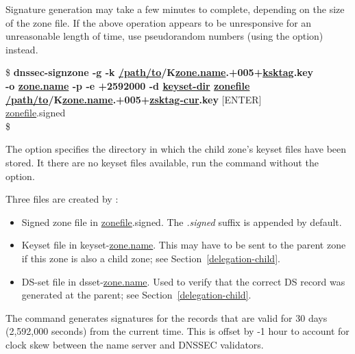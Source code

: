 Signature generation may take a few minutes to complete, depending on the size
of the zone file. If the above operation appears to be unresponsive for an
unreasonable length of time, use pseudorandom numbers (using the 
option) instead.

\begin{tabbing}
\hspace{0.5in}\$ {\bf dnssec-signzone -g -k \underline{/path/to}/K\underline{zone.name}.+005+\underline{ksktag}.key} \\
\hspace{0.5in} {\bf -o \underline{zone.name} -p -e +2592000 -d \underline{keyset-dir} \underline{zonefile}} \\
\hspace{0.5in} {\bf \underline{/path/to}/K\underline{zone.name}.+005+\underline{zsktag-cur}.key} $[$ENTER$]$ \\
\hspace{0.5in} \underline{zonefile}.signed \\
\hspace{0.5in}\$ \\
\end{tabbing}

The  option specifies the directory in which the child zone's
keyset files have been stored.  It there are no keyset files available, run
the  command without the  option.

Three files are created by :
\begin{itemize}
\item Signed zone file in \underline{zonefile}.signed.
The {\it .signed} suffix is appended by default.

\item Keyset file in keyset-\underline{zone.name}.
This may have to be sent to the parent zone if this zone is also a child zone;
see Section~\ref{delegation-child}.

\item DS-set file in dsset-\underline{zone.name}.
Used to verify that the correct DS record was generated at the parent;
see Section~\ref{delegation-child}.

\end{itemize}

The  command generates signatures for the records that
are valid for 30 days (2,592,000 seconds) from the current time.  This
is offset by -1 hour to account for clock skew between the name server and
DNSSEC validators.

